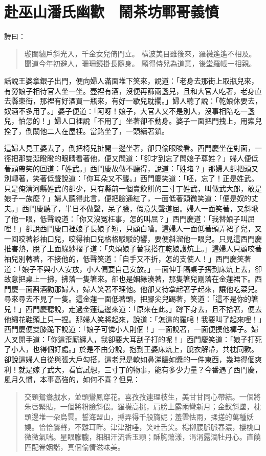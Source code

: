 
\chapter{赴巫山潘氏幽歡　鬧茶坊鄆哥義憤}

詩曰：
\begin{quote}
璇閨繡戶斜光入，千金女兒倚門立。
橫波美目雖後來，羅襪遙遙不相及。
聞道今年初避人，珊珊鏡掛長隨身。
願得侍兒為道意，後堂羅帳一相親。
\end{quote}

話說王婆拿銀子出門，便向婦人滿面堆下笑來，說道：「老身去那街上取瓶兒來，有勞娘子相待官人坐一坐。壺裡有酒，沒便再篩兩盞兒，且和大官人吃著，老身直去縣東街，那裡有好酒買一瓶來，有好一歇兒耽擱。」婦人聽了說：「乾娘休要去，奴酒不多用了。」婆子便道：「阿呀！娘子，大官人又不是別人，沒事相陪吃一盞兒，怕怎的！」婦人口裡說「不用了」坐著卻不動身。婆子一面把門拽上，用索兒拴了，倒關他二人在屋裡。當路坐了，一頭續著鎖。

這婦人見王婆去了，倒把椅兒扯開一邊坐著，卻只偷眼睃看。西門慶坐在對面，一徑把那雙涎瞪瞪的眼睛看著他，便又問道：「卻才到忘了問娘子尊姓？」婦人便低著頭帶笑的回道：「姓武。」西門慶故做不聽得，說道：「姓堵？」那婦人卻把頭又別轉著，笑著低聲說道：「你耳朵又不聾。」西門慶笑道：「呸，忘了！正是姓武。只是俺清河縣姓武的卻少，只有縣前一個賣飲餅的三寸丁姓武，叫做武大郎，敢是娘子一族麼？」婦人聽得此言，便把臉通紅了，一面低著頭微笑道：「便是奴的丈夫。」西門慶聽了，半日不做聲，呆了臉，假意失聲道屈。婦人一面笑著，又斜瞅了他一眼，低聲說道：「你又沒冤枉事，怎的叫屈？」西門慶道：「我替娘子叫屈哩！」卻說西門慶口裡娘子長娘子短，只顧白嘈。這婦人一面低著頭弄裙子兒，又一回咬著衫袖口兒，咬得袖口兒格格駁駁的響，要便斜溜他一眼兒。只見這西門慶推害熱，脫了上面綠紗褶子道：「央煩娘子替我搭在乾娘護炕上。」這婦人只顧咬著袖兒別轉著，不接他的，低聲笑道：「自手又不折，怎的支使人！」西門慶笑著道：「娘子不與小人安放，小人偏要自己安放。」一面伸手隔桌子搭到床炕上去，卻故意把桌上一拂，拂落一隻箸來。卻也是姻緣湊著，那隻箸兒剛落在金蓮裙下。西門慶一面斟酒勸那婦人，婦人笑著不理他。他卻又待拿起箸子起來，讓他吃菜兒。尋來尋去不見了一隻。這金蓮一面低著頭，把腳尖兒踢著，笑道：「這不是你的箸兒！」西門慶聽說，走過金蓮這邊來道：「原來在此。」蹲下身去，且不拾箸，便去他繡花鞋頭上只一捏。那婦人笑將起來，說道：「怎這的羅唣！我要叫了起來哩！」西門慶便雙膝跪下說道：「娘子可憐小人則個！」一面說著，一面便摸他褲子。婦人叉開手道：「你這歪廝纏人，我卻要大耳刮子打的呢！」西門慶笑道：「娘子打死了小人，也得個好處。」於是不由分說，抱到王婆床炕上，脫衣解帶，共枕同歡。卻說這婦人自從與張大戶勾搭，這老兒是軟如鼻涕膿如醬的一件東西，幾時得個爽利！就是嫁了武大，看官試想，三寸丁的物事，能有多少力量？今番遇了西門慶，風月久慣，本事高強的，如何不喜？但見：
\begin{quote}
交頸鴛鴦戲水，並頭鸞鳳穿花。喜孜孜連理枝生，美甘甘同心帶結。一個將朱唇緊貼，一個將粉臉斜偎。羅襪高挑，肩膀上露兩彎新月；金釵斜墜，枕頭邊堆一朵烏雲。誓海盟山，搏弄得千般旖妮；羞雲怯雨，揉搓的萬種妖嬈。恰恰鶯聲，不離耳畔。津津甜唾，笑吐舌尖。楊柳腰脈脈春濃，櫻桃口微微氣喘。星眼朦朧，細細汗流香玉顆；酥胸蕩漾，涓涓露滴牡丹心。直饒匹配眷姻諧，真個偷情滋味美。
\end{quote}

